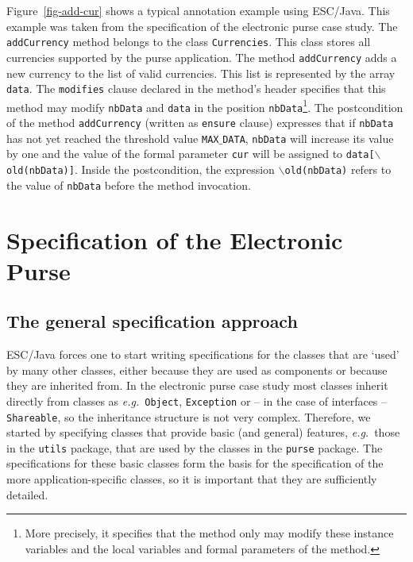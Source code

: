 \documentclass[a4paper]{llncs}
\begin{document}
Figure~\ref{fig-add-cur} shows a typical annotation example using
ESC/Java. This example was taken from the specification of the
electronic purse case study. The \texttt{addCurrency} method belongs
to the class \texttt{Currencies}. This class stores all currencies
supported by the purse application. The method
\texttt{addCurrency} adds a new currency to the list of valid
currencies. This list is represented by the
array \texttt{data}. The \texttt{modifies} clause declared in the
method's header specifies that
this method may modify \texttt{nbData} and
\texttt{data} in the position \texttt{nbData}\footnote{More precisely, it
specifies that the method only may modify these instance variables and
the local variables and formal parameters of the method.}. The
postcondition of the method \texttt{addCurrency} (written as
\texttt{ensure} clause) expresses that if \texttt{nbData} has not
yet reached the threshold value \texttt{MAX$\_$DATA}, \texttt{nbData}
will increase its value by one and the value of the formal parameter
\texttt{cur} will be assigned to \texttt{data[\(\backslash\)old(nbData)]}. 
Inside the postcondition, the expression
\texttt{$\backslash$old(nbData)} refers to the value of
\texttt{nbData} before the method invocation.






\section{Specification of the Electronic Purse}
\label{SectSpecPurse}


\subsection{The general specification approach}
ESC/Java forces one to start writing specifications for the classes
that are `used' by many other classes, either because they are used as 
components or because they are inherited from. In the electronic purse 
case study most classes inherit directly from classes as
\emph{e.g.}~\texttt{Object}, \texttt{Exception} or -- in the case of
interfaces -- \texttt{Shareable}, so the inheritance structure is not
very complex. Therefore, we started by specifying classes that
provide basic (and general) features, \emph{e.g.}~those in the
\texttt{utils} package,
that are used by the classes in the \texttt{purse} package. The
specifications for these basic classes form the basis for the
specification of the more application-specific classes, so it is
important that they are sufficiently detailed.
\end{document}
